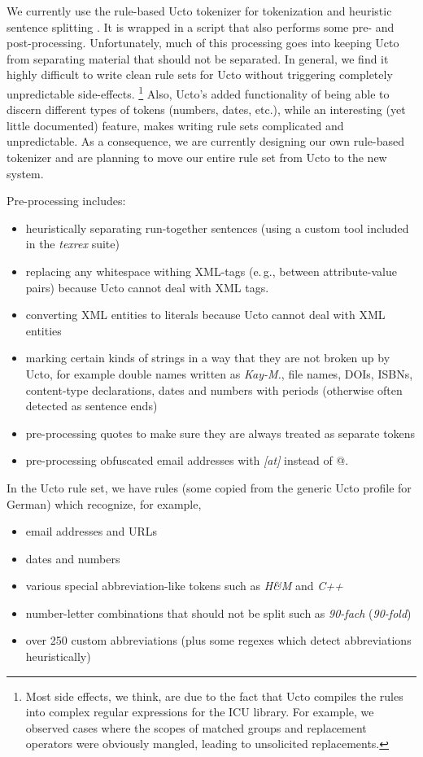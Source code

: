 \documentclass[11pt]{article}
\newcommand{\Lf}{
  \setlength{\itemsep}{1pt}
  \setlength{\parskip}{0pt}
  \setlength{\parsep}{0pt}
}
\begin{document}
We currently use the rule-based Ucto tokenizer for tokenization and heuristic sentence splitting \cite{ucto}.
It is wrapped in a script that also performs some pre- and post-processing.
Unfortunately, much of this processing goes into keeping Ucto from separating material that should not be separated.
In general, we find it highly difficult to write clean rule sets for Ucto without triggering completely unpredictable side-effects.%
\footnote{Most side effects, we think, are due to the fact that Ucto compiles the rules into complex regular expressions for the ICU library.
For example, we observed cases where the scopes of matched groups and replacement operators were obviously mangled, leading to unsolicited replacements.}
Also, Ucto's added functionality of being able to discern different types of tokens (numbers, dates, etc.), while an interesting (yet little documented) feature, makes writing rule sets complicated and unpredictable.
As a consequence, we are currently designing our own rule-based tokenizer and are planning to move our entire rule set from Ucto to the new system.

Pre-processing includes:

\begin{itemize}\Lf
  \item heuristically separating run-together sentences (using a custom tool included in the \textit{texrex} suite)
  \item replacing any whitespace withing XML-tags (e.\,g., between attribute-value pairs) because Ucto cannot deal with XML tags. 
  \item converting XML entities to literals because Ucto cannot deal with XML entities
  \item marking certain kinds of strings in a way that they are not broken up by Ucto, for example double names written as \textit{Kay-M.}, file names, DOIs, ISBNs, content-type declarations, dates and numbers with periods (otherwise often detected as sentence ends)
  \item pre-processing quotes to make sure they are always treated as separate tokens
  \item pre-processing obfuscated email addresses with \textit{[at]} instead of @.
\end{itemize}

In the Ucto rule set, we have rules (some copied from the generic Ucto profile for German) which recognize, for example,

\begin{itemize}\Lf
  \item email addresses and URLs
  \item dates and numbers
  \item various special abbreviation-like tokens such as \textit{H\&M} and \textit{C++}
  \item number-letter combinations that should not be split such as \textit{90-fach} (\textit{90-fold})
  \item over 250 custom abbreviations (plus some regexes which detect abbreviations heuristically)
\end{itemize}
\end{document}
